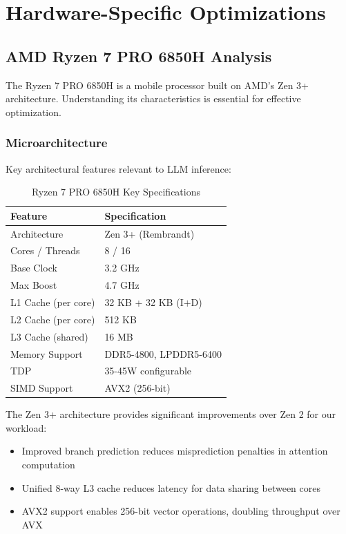 \section{Hardware-Specific Optimizations}
\label{sec:hardware}

\subsection{AMD Ryzen 7 PRO 6850H Analysis}

The Ryzen 7 PRO 6850H is a mobile processor built on AMD's Zen 3+ architecture. Understanding its characteristics is essential for effective optimization.

\subsubsection{Microarchitecture}

Key architectural features relevant to LLM inference:

\begin{table}[h]
\centering
\caption{Ryzen 7 PRO 6850H Key Specifications}
\label{tab:ryzen_specs}
\begin{tabular}{ll}
\toprule
\textbf{Feature} & \textbf{Specification} \\
\midrule
Architecture & Zen 3+ (Rembrandt) \\
Cores / Threads & 8 / 16 \\
Base Clock & 3.2 GHz \\
Max Boost & 4.7 GHz \\
L1 Cache (per core) & 32 KB + 32 KB (I$+$D) \\
L2 Cache (per core) & 512 KB \\
L3 Cache (shared) & 16 MB \\
Memory Support & DDR5-4800, LPDDR5-6400 \\
TDP & 35-45W configurable \\
SIMD Support & AVX2 (256-bit) \\
\bottomrule
\end{tabular}
\end{table}

The Zen 3+ architecture provides significant improvements over Zen 2 for our workload:

\begin{itemize}
    \item Improved branch prediction reduces misprediction penalties in attention computation
    \item Unified 8-way L3 cache reduces latency for data sharing between cores
    \item AVX2 support enables 256-bit vector operations, doubling throughput over AVX
\end{itemize}

